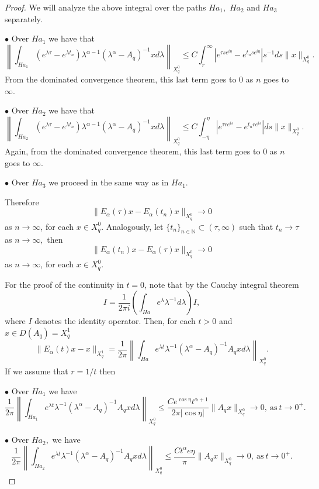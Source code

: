 \documentclass[12pt,reqno]{amsart}
\begin{document}
\begin{proof}
		We will analyze the above integral over the paths $Ha_1,$ $Ha_2$ and $Ha_3$ separately.
		
		
		\noindent $\bullet$ Over $Ha_1$ we have that
		\[\left\|\int_{Ha_1}(e^{\lambda\tau}-e^{\lambda t_n})\lambda^{\alpha-1}(\lambda^{\alpha}-A_q)^{-1}xd\lambda \right\|_{X^{0}_{q}} \leq  C \int_r^\infty \left|e^{\tau se^{i\eta}}-e^{t_n se^{i\eta}}\right|s^{-1}ds\|x\|_{X^{0}_{q}}.\]
		From the dominated convergence theorem, this last term goes to $0$ as $n$ goes to $\infty$.
		
		\noindent $\bullet$ Over $Ha_2$ we have that
		\[\left\|\int_{Ha_2}(e^{\lambda\tau}-e^{\lambda t_n})\lambda^{\alpha-1}(\lambda^{\alpha}-A_q)^{-1}xd\lambda \right\|_{X^{0}_{q}} \leq  C \int_{-\eta}^\eta \left|e^{\tau re^{is}}-e^{t_n re^{is}}\right|ds\|x\|_{X^{0}_{q}}.\]
		Again, from the dominated convergence theorem, this last term goes to $0$ as $n$ goes to $\infty$.
		
		\noindent $\bullet$ Over $Ha_3$ we proceed in the same way as in $Ha_1.$
		
		
		Therefore 
		$$\|E_\alpha(\tau )x-E_\alpha(t_n )x\|_{X^{0}_{q}}\rightarrow 0$$ 
		as $n\rightarrow\infty$, for each $x\in X^{0}_{q}$. Analogously, let $\{t_n\}_{n\in\mathbb{N}}\subset (\tau,\infty)$ such that $t_n\rightarrow \tau$ as $n\rightarrow\infty,$ then 
		$$\|E_\alpha(t_n )x-E_\alpha(\tau )x\|_{X^{0}_{q}}\rightarrow 0$$ 
		as $n\rightarrow\infty$, for each $x\in X^{0}_{q}$.
		
		For the proof of the continuity in $t=0$, note that by the Cauchy integral theorem
		\[I=\frac{1}{2\pi i}\left(\int_{Ha}e^\lambda\lambda^{-1}d\lambda\right) I,\]
		where $I$ denotes the identity operator. Then, for each $t>0$ and $x\in D(A_q)=X^{1}_{q}$ 
		\begin{equation*}
			\|E_\alpha(t)x-x\|_{X^{1}_{q}}  = \frac{1}{2\pi}\left\|\int_{Ha}e^{\lambda t}\lambda^{-1}(\lambda^{\alpha}-A_q)^{-1}A_q xd\lambda\right\|_{X^{0}_{q}}.
		\end{equation*}
		If we assume that $r=1/t$ then
		
		
		\noindent $\bullet$  Over $Ha_1$ we have 
		\begin{equation*}
			\frac{1}{2\pi}\left\|\int_{Ha_1}e^{\lambda t}\lambda^{-1}(\lambda^{\alpha}-A_q)^{-1}A_q xd\lambda\right\|_{X^{0}_{q}} \leq  \frac{Ce^{\cos\eta}t^{\alpha+1}}{2\pi|\cos\eta|}\|A_q x\|_{X^{0}_{q}}\to 0,\ \mbox{as}\  t\rightarrow 0^+.
		\end{equation*}
		
		\noindent $\bullet$  Over $Ha_2,$ we have 
		\begin{equation*}
			\frac{1}{2\pi}\left\|\int_{Ha_2}e^{\lambda t}\lambda^{-1}(\lambda^{\alpha}-A_q)^{-1}A_q xd\lambda\right\|_{X^{0}_{q}}  \leq  \frac{Ct^{\alpha}e\eta}{\pi}\|A_q x\|_{X^{0}_{q}}\to 0,\ \mbox{as}\  t\rightarrow 0^+.
		\end{equation*}
		

\end{proof}
\end{document}
